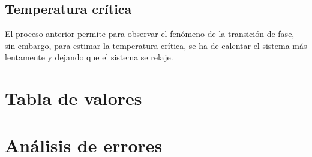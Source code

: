\documentclass[11pt, twoside]{article} %
\begin{document}
\subsection{Temperatura crítica}

El proceso anterior permite para observar el fenómeno de la transición de fase,
sin embargo, para estimar la temperatura crítica, se ha de calentar el sistema más 
lentamente y dejando que el sistema se relaje.





\newpage

\appendix

\section{Tabla de valores}


\newpage

\section{Análisis de errores}
\end{document}
